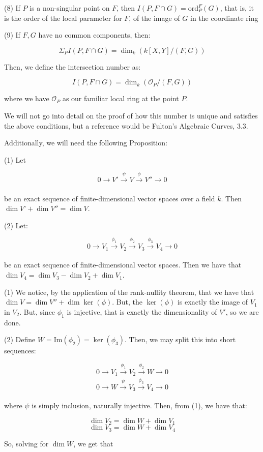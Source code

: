 \documentclass[10pt]{article}
\begin{document}
(8) If $P$ is a non-singular point on $F$, then $I(P, F \cap G) = \text{ord}_P^F(G)$, that is, it is the order of the local parameter for $F$, of the image of $G$ in the coordinate ring

(9) If $F,G$ have no common components, then:

$$ \Sigma_P  I(P,F \cap G) = \dim_k(k[X,Y]/(F,G)) $$

Then, we define the intersection number as:

$$ I(P,F \cap G) = \dim_k(\mathcal{O}_P/(F,G)) $$

where we have $\mathcal{O}_P$ as our familiar local ring at the point $P$.

We will not go into detail on the proof of how this number is unique and satisfies the above conditions, but a reference would be Fulton’s Algebraic Curves, 3.3.

Additionally, we will need the following Proposition:

(1) Let 

$$ 0 \to V' \xrightarrow[]{\psi} V  \xrightarrow[]{\phi} V'' \to 0 $$

be an exact sequence of finite-dimensional vector spaces over a field $k$. Then $\dim V’ + \dim V''= \dim V$.

(2) Let:

$$ 0 \to V_1 \xrightarrow[]{\phi_1} V_2 \xrightarrow[]{\phi_2} V_3 \xrightarrow[]{\phi_3} V_4 \to 0 $$

be an exact sequence of finite-dimensional vector spaces. Then we have that $\dim V_4 = \dim V_3 - \dim V_2 + \dim V_1$.

(1) We notice, by the application of the rank-nullity theorem, that we have that $\dim V = \dim V'' + \dim \ker(\phi)$. But, the $\ker(\phi)$ is exactly the image of $V_1$ in $V_2$. But, since $\phi_1$ is injective, that is exactly the dimensionality of $V'$, so we are done.

(2) Define $W = \text{Im}(\phi_2) = \ker(\phi_3)$. Then, we may split this into short sequences:

$$ 0 \to  V_1 \xrightarrow[]{\phi_1} V_2 \xrightarrow[]{\phi_2} W \to 0 $$
$$ 0 \to W \xrightarrow[]{\psi} V_3  \xrightarrow[]{\phi_3} V_4 \to 0 $$

where $\psi$ is simply inclusion, naturally injective. Then, from (1), we have that:

$$\dim V_2 = \dim W + \dim V_1$$
$$ \dim V_3 = \dim W + \dim V_4$$

So, solving for $\dim W$, we get that
\end{document}
